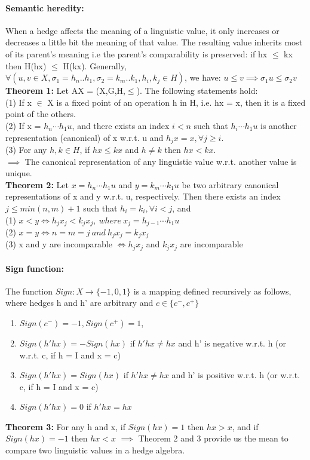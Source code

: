 \documentclass[part1.tex]{subfiles}
\begin{document}
\paragraph {Semantic heredity:} When a hedge affects the meaning of a linguistic value, it only
	increases or decreases a little bit the meaning of that value. The resulting value inherits
	most of its parent's meaning i.e the parent's comparability is preserved: 
	if hx \(\le\) kx then H(hx) \(\le\) H(kx). Generally, \(\forall (u,v \in X, 
	\sigma_1 = h_n..h_1, \sigma_2 = k_m..k_1, h_i,k_j \in H)\), we have:
	\(u \le v \implies \sigma_1u \le \sigma_2v\)\\
{\bfseries Theorem 1:} Let AX = (X,G,H,\(\le\)). The following statements hold:\\
\indent (1) If x \(\in\) X is a fixed point of an operation h in H, i.e. hx = x, then it is a fixed
	 point of the others.\\
\indent (2) If x = \(h_n \cdots h_1 u\), and there exists an index \(i<n\) such that \(h_i \cdots h_1 u\)        is another representation (canonical) of x w.r.t. u and \(h_j x = x, \forall j\ge i\).\\
\indent (3) For any \(h, k\in H\), if \(hx\le kx\) and \(h\neq k\) then \(hx< kx\).\\
\indent \(\implies\) The canonical representation of any linguistic value w.r.t. another value is unique.	\\
{\bfseries Theorem 2:} Let \(x = h_n \cdots h_1 u\) and \(y = k_m \cdots k_1 u\) be two arbitrary
	canonical representations of x and y w.r.t. u, respectively. Then there exists an index
        \(j \le min(n, m) + 1\) such that \(h_i = k_i, \forall i < j\), and\\
        \indent (1) \(x < y \iff h_j x_j < k_j x_j ,\: where \:
        x_j = h_{j-1} \cdots h_1 u\)\\
\indent (2) \(x = y \iff n = m = j\: and\: h_j x_j = k_j x_j\)\\
\indent (3) x and y are incomparable \(\iff h_j x_j\) and \(k_j x_j\) are incomparable\\
\paragraph {Sign function:} The function $Sign: X \rightarrow
\{-1,0,1\}$ is a mapping defined recursively as follows, where
hedges h and h' are arbitrary and $c \in \{c^{-}, c^{+}\}$
\begin{enumerate}
        \item $Sign(c^{-}) = -1, Sign(c^{+}) = 1$,
        \item $Sign(h'hx) = -Sign(hx)$ if $h'hx \neq hx$ and h'
                is negative w.r.t. h (or w.r.t. c, if h = I and x
                = c)
        \item $Sign(h'hx) = Sign(hx)$ if $h'hx \neq hx$ and h'
                is positive w.r.t. h (or w.r.t. c, if h = I and x
                = c)
        \item $Sign(h'hx) = 0$ if $h'hx = hx$
\end{enumerate}
{\bfseries Theorem 3:} For any h and x, if $Sign(hx) = 1$ then
$hx > x$, and if $Sign(hx) = -1$ then $hx < x$
\indent \(\implies\) Theorem 2 and 3 provide us the mean to
compare two linguistic values in a hedge 
algebra.
\end{document}
